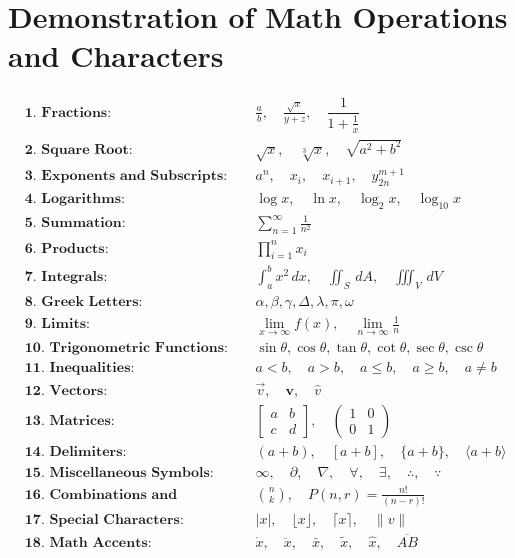 \documentclass{article}
\begin{document}
\section*{Demonstration of Math Operations and Characters}

\[
\begin{aligned}
    &\textbf{1. Fractions:} && \frac{a}{b}, \quad \frac{\sqrt{x}}{y+z}, \quad \dfrac{1}{1 + \frac{1}{x}} \\
    &\textbf{2. Square Root:} && \sqrt{x}, \quad \sqrt[3]{x}, \quad \sqrt{a^2 + b^2} \\
    &\textbf{3. Exponents and Subscripts:} && a^n, \quad x_i, \quad x_{i+1}, \quad y_{2n}^{m+1} \\
    &\textbf{4. Logarithms:} && \log x, \quad \ln x, \quad \log_2 x, \quad \log_{10} x \\
    &\textbf{5. Summation:} && \sum_{n=1}^\infty \frac{1}{n^2} \\
    &\textbf{6. Products:} && \prod_{i=1}^n x_i \\
    &\textbf{7. Integrals:} && \int_a^b x^2 \, dx, \quad \iint_S \, dA, \quad \iiint_V \, dV \\
    &\textbf{8. Greek Letters:} && \alpha, \beta, \gamma, \Delta, \lambda, \pi, \omega \\
    &\textbf{9. Limits:} && \lim_{x \to \infty} f(x), \quad \lim_{n \to \infty} \frac{1}{n} \\
    &\textbf{10. Trigonometric Functions:} && \sin \theta, \cos \theta, \tan \theta, \cot \theta, \sec \theta, \csc \theta \\
    &\textbf{11. Inequalities:} && a < b, \quad a > b, \quad a \leq b, \quad a \geq b, \quad a \neq b \\
    &\textbf{12. Vectors:} && \vec{v}, \quad \mathbf{v}, \quad \hat{v} \\
    &\textbf{13. Matrices:} &&
    \begin{bmatrix}
        a & b \\
        c & d
    \end{bmatrix}, \quad
    \begin{pmatrix}
        1 & 0 \\
        0 & 1
    \end{pmatrix} \\
    &\textbf{14. Delimiters:} &&
    (a+b), \quad [a+b], \quad \{a+b\}, \quad \langle a+b \rangle \\
    &\textbf{15. Miscellaneous Symbols:} &&
    \infty, \quad \partial, \quad \nabla, \quad \forall, \quad \exists, \quad \therefore, \quad \because \\
    &\textbf{16. Combinations and Permutations:} &&
    \binom{n}{k}, \quad P(n, r) = \frac{n!}{(n-r)!} \\
    &\textbf{17. Special Characters:} &&
    |x|, \quad \lfloor x \rfloor, \quad \lceil x \rceil, \quad \|v\| \\
    &\textbf{18. Math Accents:} &&
    \dot{x}, \quad \ddot{x}, \quad \bar{x}, \quad \tilde{x}, \quad \hat{x}, \quad \overline{AB} \\
\end{aligned}
\]
\end{document}
